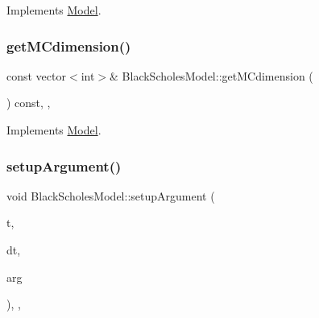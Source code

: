 Implements \hyperlink{class_model_a087d56280bb51e8b04be3a9a30d06c76}{Model}.

\hypertarget{class_black_scholes_model_a5665e6ea247e4f243082f5c98bbdbad6}{}\label{class_black_scholes_model_a5665e6ea247e4f243082f5c98bbdbad6} 
\subsubsection{\texorpdfstring{get\+M\+Cdimension()}{getMCdimension()}}
{\footnotesize\ttfamily const vector$<$int$>$\& Black\+Scholes\+Model\+::get\+M\+Cdimension (\begin{DoxyParamCaption}{ }\end{DoxyParamCaption}) const\hspace{0.3cm}{\ttfamily [inline]}, {\ttfamily [override]}, {\ttfamily [virtual]}}



Implements \hyperlink{class_model_ac8a8c7e69b0be1df63ad141e0e14bf1e}{Model}.

\hypertarget{class_black_scholes_model_a04a6ba4c59cd70a92dedbeb482e9d5aa}{}\label{class_black_scholes_model_a04a6ba4c59cd70a92dedbeb482e9d5aa} 
\subsubsection{\texorpdfstring{setup\+Argument()}{setupArgument()}}
{\footnotesize\ttfamily void Black\+Scholes\+Model\+::setup\+Argument (\begin{DoxyParamCaption}\item[{\hyperlink{_name_def_8h_ac2d3e0ba793497bcca555c7c2cf64ff3}{Time}}]{t,  }\item[{\hyperlink{_name_def_8h_ac2d3e0ba793497bcca555c7c2cf64ff3}{Time}}]{dt,  }\item[{\hyperlink{class_generic_random_variable_generator_1_1_argument}{Generic\+Random\+Variable\+Generator\+::\+Argument} $\ast$}]{arg }\end{DoxyParamCaption})\hspace{0.3cm}{\ttfamily [inline]}, {\ttfamily [override]}, {\ttfamily [virtual]}}



